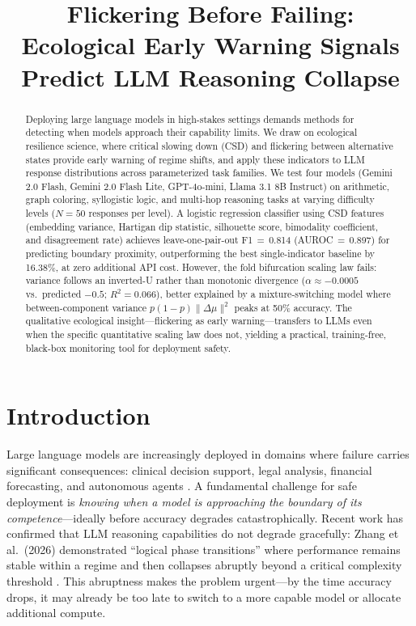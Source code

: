 \documentclass[11pt,letterpaper]{article}
\begin{document}
\title{Flickering Before Failing: Ecological Early Warning Signals Predict LLM Reasoning Collapse}

\begin{abstract}
Deploying large language models in high-stakes settings demands methods for detecting when models approach their capability limits. We draw on ecological resilience science, where critical slowing down (CSD) and flickering between alternative states provide early warning of regime shifts, and apply these indicators to LLM response distributions across parameterized task families. We test four models (Gemini 2.0 Flash, Gemini 2.0 Flash Lite, GPT-4o-mini, Llama 3.1 8B Instruct) on arithmetic, graph coloring, syllogistic logic, and multi-hop reasoning tasks at varying difficulty levels ($N=50$ responses per level). A logistic regression classifier using CSD features (embedding variance, Hartigan dip statistic, silhouette score, bimodality coefficient, and disagreement rate) achieves leave-one-pair-out F1$\,{=}\,$0.814 (AUROC$\,{=}\,$0.897) for predicting boundary proximity, outperforming the best single-indicator baseline by 16.38\%, at zero additional API cost. However, the fold bifurcation scaling law fails: variance follows an inverted-U rather than monotonic divergence ($\hat{\alpha}\approx -0.0005$ vs.\ predicted $-0.5$; $R^2=0.066$), better explained by a mixture-switching model where between-component variance $p(1{-}p)\|\Delta\mu\|^2$ peaks at 50\% accuracy. The qualitative ecological insight---flickering as early warning---transfers to LLMs even when the specific quantitative scaling law does not, yielding a practical, training-free, black-box monitoring tool for deployment safety.
\end{abstract}

\section{Introduction}
\label{sec:intro}

Large language models are increasingly deployed in domains where failure carries significant consequences: clinical decision support, legal analysis, financial forecasting, and autonomous agents \cite{huang2025survey}. A fundamental challenge for safe deployment is \emph{knowing when a model is approaching the boundary of its competence}---ideally before accuracy degrades catastrophically. Recent work has confirmed that LLM reasoning capabilities do not degrade gracefully: Zhang et al.~(2026) demonstrated ``logical phase transitions'' where performance remains stable within a regime and then collapses abruptly beyond a critical complexity threshold \cite{zhang2026logical}. This abruptness makes the problem urgent---by the time accuracy drops, it may already be too late to switch to a more capable model or allocate additional compute.
\end{document}
